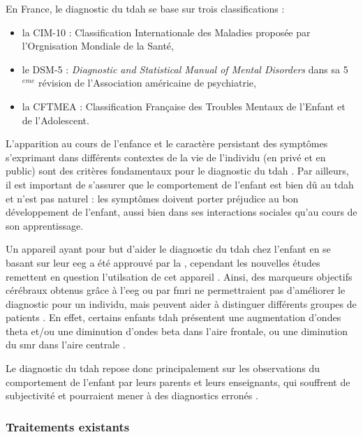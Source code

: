 En France, le diagnostic du \gls{tdah} se base sur trois classifications \citep{HAS} :
\begin{itemize}
\item la CIM-10 : Classification Internationale des Maladies proposée par l'Orgnisation Mondiale de la Santé,
\item le DSM-5 : \textit{Diagnostic and Statistical Manual of Mental Disorders} dans sa 5$^{eme}$ révision de l'Association américaine de
psychiatrie,
\item la CFTMEA : Classification Française des Troubles Mentaux de l’Enfant et de l’Adolescent.
\end{itemize}

L'apparition au cours de l'enfance et le caractère persistant des symptômes s'exprimant dans différents contextes de la vie de l'individu (en privé et 
en public) sont des critères fondamentaux pour le diagnostic du \gls{tdah} \citep{HAS}. Par ailleurs, il est important de s'assurer que le comportement de
l'enfant est bien dû au \gls{tdah} et n'est pas naturel : les symptômes doivent porter préjudice au bon développement de l'enfant, aussi bien dans ses
interactions sociales qu'au cours de son apprentissage. 

Un appareil ayant pour but d'aider le diagnostic du \gls{tdah} chez l'enfant en se basant sur leur \gls{eeg} 
a été approuvé par la \citet{FDA} \citep{NebaHealth}, cependant les nouvelles études remettent en question l'utilsation de cet appareil \citep{Arns2013, 
Zhang2017}. Ainsi, des marqueurs objectifs cérébraux obtenus grâce à l'\gls{eeg} ou par \gls{fmri} ne permettraient pas d'améliorer le diagnostic pour un individu, mais
peuvent aider à distinguer différents groupes de patients \citep{Johnstone2005, Zhang2017, Clarke2011}. En effet, certains enfants \gls{tdah} 
présentent une augmentation d'ondes theta et/ou une diminution d'ondes beta dans l'aire frontale, ou une diminution du \gls{smr} dans l'aire centrale
\citep{Monastra2005, Janzen1995, Loo2018}. 

Le diagnostic du \gls{tdah} repose donc principalement sur les observations du comportement de l'enfant par leurs parents et leurs enseignants, qui souffrent de
subjectivité et pourraient mener à des diagnostics erronés \citep{Lambez2019}.

\subsubsection{Traitements existants}

